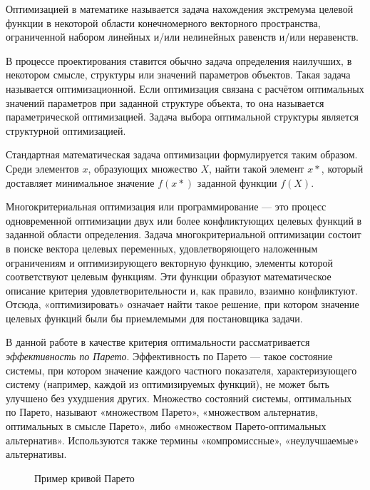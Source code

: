\startprefacepage

Оптимизацией в математике называется задача нахождения экстремума целевой функции в 
некоторой области конечномерного векторного пространства, ограниченной набором линейных 
и/или нелинейных равенств и/или неравенств.

В процессе проектирования ставится обычно задача определения наилучших, в некотором смысле, 
структуры или значений параметров объектов. Такая задача называется оптимизационной. 
Если оптимизация связана с расчётом оптимальных значений параметров при заданной структуре 
объекта, то она называется параметрической оптимизацией. Задача выбора оптимальной структуры 
является структурной оптимизацией.\cite{wiki_opt}

Стандартная математическая задача оптимизации формулируется таким образом. Среди элементов $x$, 
образующих множество $X$, найти такой элемент $x*$, который доставляет минимальное значение 
$f(x*)$ заданной функции $f(X)$.

Многокритериальная оптимизация или программирование — это процесс одновременной оптимизации 
двух или более конфликтующих целевых функций в заданной области определения. Задача 
многокритериальной оптимизации состоит в поиске вектора целевых переменных, удовлетворяющего 
наложенным ограничениям и оптимизирующего векторную функцию, элементы которой соответствуют 
целевым функциям. Эти функции образуют математическое описание критерия удовлетворительности 
и, как правило, взаимно конфликтуют. Отсюда, «оптимизировать» означает найти такое решение, 
при котором значение целевых функций были бы приемлемыми для постановщика задачи. \cite{wiki_multiopt}

В данной работе в качестве критерия оптимальности рассматривается \textit{эффективность по Парето}. 
Эффективность по Парето — такое состояние системы, при котором значение каждого частного 
показателя, характеризующего систему (например, каждой из оптимизируемых функций), не может 
быть улучшено без ухудшения других. Множество состояний системы, оптимальных по Парето, 
называют «множеством Парето», «множеством альтернатив, оптимальных в смысле Парето», 
либо «множеством Парето-оптимальных альтернатив». Используются также термины «компромиссные», 
«неулучшаемые» альтернативы. \cite{wiki_pareto}

	\begin{figure}[h!]
		\caption{Пример кривой Парето}
		\label{pict:par1}
	\end{figure}

